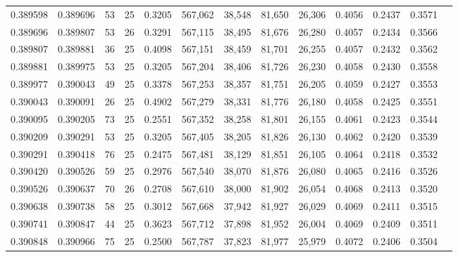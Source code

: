 \begin{tabular}{rrrrrrrrrrrrr}
0.389598 & 0.389696 &    53 &  25 &                                     0.3205 & 567,062 &  38,548 &  81,650 &  26,306 & 0.4056 & 0.2437 & 0.3571 \\
0.389696 & 0.389807 &    53 &  26 &                                     0.3291 & 567,115 &  38,495 &  81,676 &  26,280 & 0.4057 & 0.2434 & 0.3566 \\
0.389807 & 0.389881 &    36 &  25 &                                     0.4098 & 567,151 &  38,459 &  81,701 &  26,255 & 0.4057 & 0.2432 & 0.3562 \\
0.389881 & 0.389975 &    53 &  25 &                                     0.3205 & 567,204 &  38,406 &  81,726 &  26,230 & 0.4058 & 0.2430 & 0.3558 \\
0.389977 & 0.390043 &    49 &  25 &                                     0.3378 & 567,253 &  38,357 &  81,751 &  26,205 & 0.4059 & 0.2427 & 0.3553 \\
0.390043 & 0.390091 &    26 &  25 &                                     0.4902 & 567,279 &  38,331 &  81,776 &  26,180 & 0.4058 & 0.2425 & 0.3551 \\
0.390095 & 0.390205 &    73 &  25 &                                     0.2551 & 567,352 &  38,258 &  81,801 &  26,155 & 0.4061 & 0.2423 & 0.3544 \\
0.390209 & 0.390291 &    53 &  25 &                                     0.3205 & 567,405 &  38,205 &  81,826 &  26,130 & 0.4062 & 0.2420 & 0.3539 \\
0.390291 & 0.390418 &    76 &  25 &                                     0.2475 & 567,481 &  38,129 &  81,851 &  26,105 & 0.4064 & 0.2418 & 0.3532 \\
0.390420 & 0.390526 &    59 &  25 &                                     0.2976 & 567,540 &  38,070 &  81,876 &  26,080 & 0.4065 & 0.2416 & 0.3526 \\
0.390526 & 0.390637 &    70 &  26 &                                     0.2708 & 567,610 &  38,000 &  81,902 &  26,054 & 0.4068 & 0.2413 & 0.3520 \\
0.390638 & 0.390738 &    58 &  25 &                                     0.3012 & 567,668 &  37,942 &  81,927 &  26,029 & 0.4069 & 0.2411 & 0.3515 \\
0.390741 & 0.390847 &    44 &  25 &                                     0.3623 & 567,712 &  37,898 &  81,952 &  26,004 & 0.4069 & 0.2409 & 0.3511 \\
0.390848 & 0.390966 &    75 &  25 &                                     0.2500 & 567,787 &  37,823 &  81,977 &  25,979 & 0.4072 & 0.2406 & 0.3504 \\

\end{tabular}
